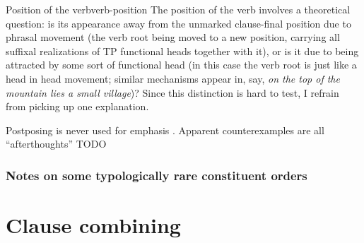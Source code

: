 \documentclass[a4paper, oneside]{report}
\newcommand*{\citepage}[1]{p.~{#1}}
\newcommand{\form}[1]{\emph{#1}}
\begin{document}
\begin{infobox}{Position of the verb}{verb-position}
    The position of the verb involves a theoretical question:
    is its appearance away from the unmarked clause-final position
    due to phrasal movement 
    (the verb root being moved to a new position, 
    carrying all suffixal realizations of 
    TP functional heads together with it),
    or is it due to being attracted by some sort of functional head
    (in this case the verb root is just like a head in head movement;
    similar mechanisms appear in, say, 
    \form{on the top of the mountain \emph{lies} a small village})?
    Since this distinction is hard to test, 
    I refrain from picking up one explanation.
\end{infobox}

Postposing is never used for emphasis \citep[\citepage{395}]{allen1903allen}.
Apparent counterexamples are all ``afterthoughts'' TODO

\subsection{Notes on some typologically rare constituent orders}

\chapter{Clause combining}
\end{document}
